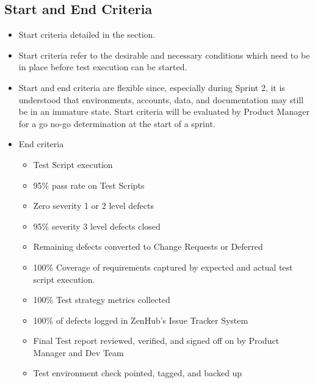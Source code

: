 \documentclass[letterpaper,10pt,english,openany,oneside]{sphinxmanual}
\begin{document}
\subsection{Start and End Criteria}
\label{\detokenize{test_plan/issue_management:start-and-end-criteria}}\begin{itemize}
\item {} 
Start criteria detailed in the {\hyperref[\detokenize{test_plan/strategy:strategy}]{}} section.

\item {} 
Start criteria refer to the desirable and necessary conditions which need to be in place before test execution can be started.

\item {} 
Start and end criteria are flexible since, especially during Sprint 2, it is understood that environments, accounts, data, and documentation may still be in an immature state. Start criteria will be evaluated by Product Manager for a go no-go determination at the start of a sprint.

\item {} 
End criteria
\begin{itemize}
\item {} 
Test Script execution     

\item {} 
95\% pass rate on Test Scripts             

\item {} 
Zero severity 1 or 2 level defects        

\item {} 
95\% severity 3 level defects closed 

\item {} 
Remaining defects converted to Change Requests or Deferred   

\item {} 
100\% Coverage of requirements captured by expected and actual test script execution.                      

\item {} 
100\% Test strategy metrics collected      

\item {} 
100\% of defects logged in ZenHub’s  Issue Tracker System  

\item {} 
Final Test report reviewed, verified, and signed off on by Product Manager and Dev Team

\item {} 
Test environment check pointed, tagged, and backed up     

\end{itemize}

\end{itemize}
\end{document}
